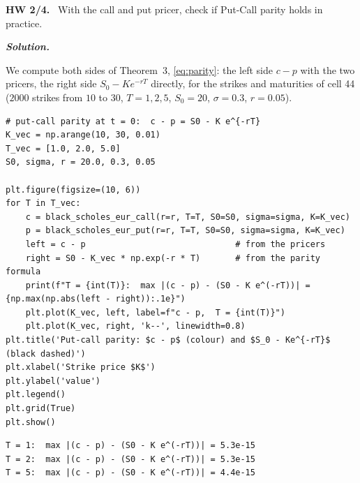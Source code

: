 \documentclass[11pt,a4paper]{article}
\newenvironment{exercise}[1]{\par\medskip\noindent\textbf{#1.}\ }{\par\medskip}
\newcommand{\solution}{\par\noindent\textbf{\textit{Solution.}}\ }
\newcommand{\subhead}[1]{\par\medskip\noindent{\large\bfseries #1}\par\smallskip\noindent\ignorespaces}
\begin{document}
\begin{exercise}{HW 2/4}
With the call and put pricer, check if Put-Call parity holds in practice.
\end{exercise}
\solution
\subhead{What is checked.} We compute both sides of Theorem~3, \eqref{eq:parity}: the left side $c-p$ with the two pricers, the right side $S_0-Ke^{-rT}$ directly, for the strikes and maturities of cell 44 ($2000$ strikes from $10$ to $30$, $T=1,2,5$, $S_0=20$, $\sigma=0.3$, $r=0.05$).
\par\smallskip\noindent\begin{minipage}{\linewidth}\begin{lstlisting}[style=prof,title={parity check}]
# put-call parity at t = 0:  c - p = S0 - K e^{-rT}
K_vec = np.arange(10, 30, 0.01)
T_vec = [1.0, 2.0, 5.0]
S0, sigma, r = 20.0, 0.3, 0.05

plt.figure(figsize=(10, 6))
for T in T_vec:
    c = black_scholes_eur_call(r=r, T=T, S0=S0, sigma=sigma, K=K_vec)
    p = black_scholes_eur_put(r=r, T=T, S0=S0, sigma=sigma, K=K_vec)
    left = c - p                              # from the pricers
    right = S0 - K_vec * np.exp(-r * T)       # from the parity formula
    print(f"T = {int(T)}:  max |(c - p) - (S0 - K e^(-rT))| = {np.max(np.abs(left - right)):.1e}")
    plt.plot(K_vec, left, label=f"c - p,  T = {int(T)}")
    plt.plot(K_vec, right, 'k--', linewidth=0.8)
plt.title('Put-call parity: $c - p$ (colour) and $S_0 - Ke^{-rT}$ (black dashed)')
plt.xlabel('Strike price $K$')
plt.ylabel('value')
plt.legend()
plt.grid(True)
plt.show()
\end{lstlisting}
\begin{lstlisting}[style=out,title={output}]
T = 1:  max |(c - p) - (S0 - K e^(-rT))| = 5.3e-15
T = 2:  max |(c - p) - (S0 - K e^(-rT))| = 5.3e-15
T = 5:  max |(c - p) - (S0 - K e^(-rT))| = 4.4e-15
\end{lstlisting}\end{minipage}\par\smallskip
\end{document}
